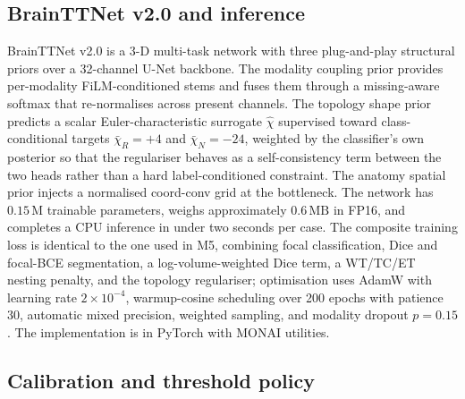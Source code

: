 \documentclass[11pt,a4paper]{article}
\begin{document}
\subsection{BrainTTNet v2.0 and inference}

BrainTTNet v2.0 is a 3-D multi-task network with three plug-and-play structural priors over a 32-channel U-Net backbone. The modality coupling prior provides per-modality FiLM-conditioned stems and fuses them through a missing-aware softmax that re-normalises across present channels. The topology shape prior predicts a scalar Euler-characteristic surrogate $\hat{\chi}$ supervised toward class-conditional targets $\bar{\chi}_R=+4$ and $\bar{\chi}_N=-24$, weighted by the classifier's own posterior so that the regulariser behaves as a self-consistency term between the two heads rather than a hard label-conditioned constraint. The anatomy spatial prior injects a normalised coord-conv grid at the bottleneck. The network has $0.15\,\text{M}$ trainable parameters, weighs approximately $0.6\,\text{MB}$ in FP16, and completes a CPU inference in under two seconds per case. The composite training loss is identical to the one used in M5, combining focal classification, Dice and focal-BCE segmentation, a log-volume-weighted Dice term, a WT/TC/ET nesting penalty, and the topology regulariser; optimisation uses AdamW with learning rate $2\times 10^{-4}$, warmup-cosine scheduling over 200 epochs with patience 30, automatic mixed precision, weighted sampling, and modality dropout $p=0.15$. The implementation is in PyTorch with MONAI utilities.

\subsection{Calibration and threshold policy}
\end{document}

